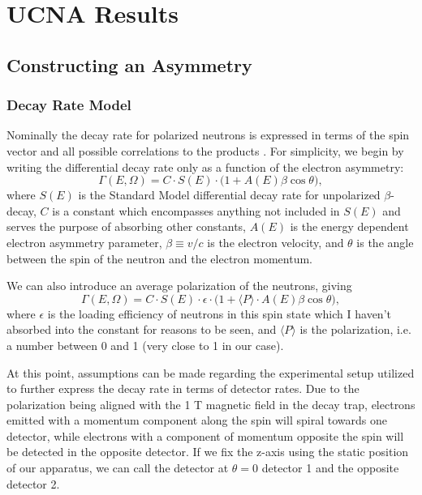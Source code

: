 \chapter{UCNA Results}
\label{ch:UCNA_Results}


\section{Constructing an Asymmetry} \label{sec:asymmetry}

\subsection{Decay Rate Model}
Nominally the decay rate for polarized neutrons is expressed in terms of the spin
vector and all possible correlations to the products \cite{jackson1957}. For simplicity,
we begin by writing the differential decay rate only as a function of the
electron asymmetry: 
%
\begin{equation} \label{eq:simpleRate}
\Gamma\left(E,\Omega\right)=C \cdot S(E) \cdot \big( 1+A(E)\beta\cos\theta \big),
\end{equation}
%
\noindent where $S(E)$ is the Standard Model differential decay rate for unpolarized
$\beta$-decay, $C$
is a constant which encompasses anything not included in $S(E)$ and serves the 
purpose of absorbing other constants, $A(E)$ is the 
energy dependent electron asymmetry parameter, $\beta\equiv v/c$ is the electron
velocity, and 
$\theta$ is the angle between the spin of the neutron and the electron momentum.

We can also introduce an average polarization of the neutrons, giving
%
\begin{equation}
  \Gamma\left(E,\Omega\right)=C \cdot S(E) \cdot \epsilon \cdot
  \big( 1+ \langle P \rangle\cdot A(E)\beta\cos\theta \big),
\end{equation}
%
\noindent where $\epsilon$ is the loading efficiency of neutrons
in this spin state which I haven't absorbed
into the constant for reasons to be seen, and 
$\langle P \rangle$ is the polarization, i.e. a number between 0 and 1 (very close to 1
in our case).

At this point, assumptions can be made regarding the experimental setup utilized
to further express the decay rate in terms of detector rates. Due to the polarization
being aligned with the 1 T magnetic field in the decay trap, electrons emitted with
a momentum component along the spin will spiral towards one detector, while electrons
with a component of momentum opposite the spin will be detected in the opposite 
detector. If we fix the z-axis using the static position of our
apparatus, we can call the detector at $\theta=0$ detector
1 and the opposite detector 2. 

